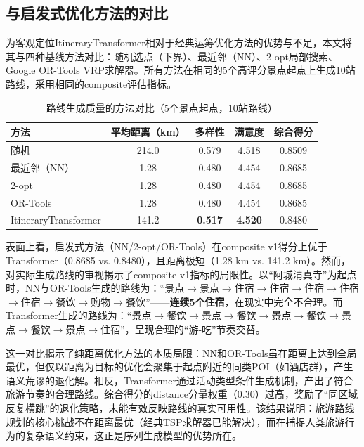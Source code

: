 \documentclass[12pt,a4paper]{ctexart}
\newenvironment{tighttable}
  {\setstretch{1.0}\small}
  {}
\begin{document}
\subsection{与启发式优化方法的对比}

为客观定位ItineraryTransformer相对于经典运筹优化方法的优势与不足，本文将其与四种基线方法对比：随机选点（下界）、最近邻（NN）、2-opt局部搜索、Google OR-Tools VRP求解器。所有方法在相同的5个高评分景点起点上生成10站路线，采用相同的composite评估指标。

\begin{table}[H]
\centering
\caption{路线生成质量的方法对比（5个景点起点，10站路线）}
\label{tab:baseline_comparison}
\begin{tighttable}
\begin{tabular}{lcccc}
\toprule
方法 & 平均距离（km） & 多样性 & 满意度 & 综合得分 \\
\midrule
随机 & 214.0 & 0.579 & 4.518 & 0.8509 \\
最近邻（NN） & 1.28 & 0.480 & 4.454 & 0.8685 \\
2-opt & 1.28 & 0.480 & 4.454 & 0.8685 \\
OR-Tools & 1.28 & 0.480 & 4.454 & 0.8685 \\
ItineraryTransformer & 141.2 & \textbf{0.517} & \textbf{4.520} & 0.8480 \\
\bottomrule
\end{tabular}
\end{tighttable}
\end{table}

表面上看，启发式方法（NN/2-opt/OR-Tools）在composite v1得分上优于Transformer（0.8685 vs. 0.8480），且距离极短（1.28 km vs. 141.2 km）。然而，对实际生成路线的审视揭示了composite v1指标的局限性。以“阿城清真寺”为起点时，NN与OR-Tools生成的路线为：“景点$\to$景点$\to$住宿$\to$住宿$\to$住宿$\to$住宿$\to$住宿$\to$餐饮$\to$购物$\to$餐饮”——\textbf{连续5个住宿}，在现实中完全不合理。而Transformer生成的路线为：“景点$\to$餐饮$\to$景点$\to$餐饮$\to$景点$\to$餐饮$\to$景点$\to$餐饮$\to$景点$\to$住宿”，呈现合理的“游-吃”节奏交替。

这一对比揭示了纯距离优化方法的本质局限：NN和OR-Tools虽在距离上达到全局最优，但仅以距离为目标的优化会聚集于起点附近的同类POI（如酒店群），产生语义荒谬的退化解。相反，Transformer通过活动类型条件生成机制，产出了符合旅游节奏的合理路线。综合得分的distance分量权重（0.30）过高，奖励了“同区域反复横跳”的退化策略，未能有效反映路线的真实可用性。该结果说明：旅游路线规划的核心挑战不在距离最优（经典TSP求解器已能解决），而在捕捉人类旅游行为的复杂语义约束，这正是序列生成模型的优势所在。
\end{document}
